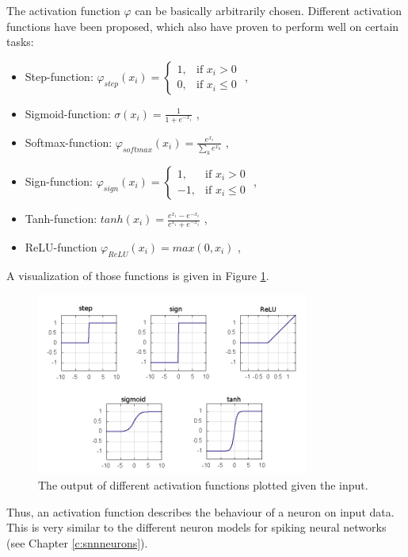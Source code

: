 The activation function $\varphi$ can be basically arbitrarily chosen. 
Different activation functions have been proposed, which also have proven to perform well on certain tasks:

\begin{itemize}
	\item Step-function: $\varphi_{step}(x_i) = \begin{cases} 1, & \text{if  } x_i > 0 \\ 0, & \text{if  } x_i \le 0  \end{cases}$ , 
	\item Sigmoid-function: $\sigma(x_i) = \frac{1}{1 + e^{-x_i}}$ ,
	\item Softmax-function: $\varphi_{softmax}(x_i) = \frac{e^{x_i}}{\sum_k e^{x_k}}$ ,
	\item Sign-function: $\varphi_{sign}(x_i) = \begin{cases} 1, & \text{if  } x_i > 0 \\ -1, & \text{if  } x_i \le 0  \end{cases}$ ,
	\item Tanh-function: $tanh(x_i) = \frac{e^{x_i} - e^{-x_i}}{e^{x_i} + e^{-x_i}}$ ,
	\item ReLU-function $\varphi_{ReLU}(x_i) = max(0, x_i)$ ,
\end{itemize}

A visualization of those functions is given in Figure \ref{fig:activations}.

\begin{figure}
	\centering
    	\includegraphics[width=0.8\textwidth]{imgs/act_fun.png} 
    \caption{The output of different activation functions plotted given the input.}
	\label{fig:activations}
\end{figure}

Thus, an activation function describes the behaviour of a neuron on input data.
This is very similar to the different neuron models for spiking neural networks (see Chapter \ref{c:snnneurons}).


